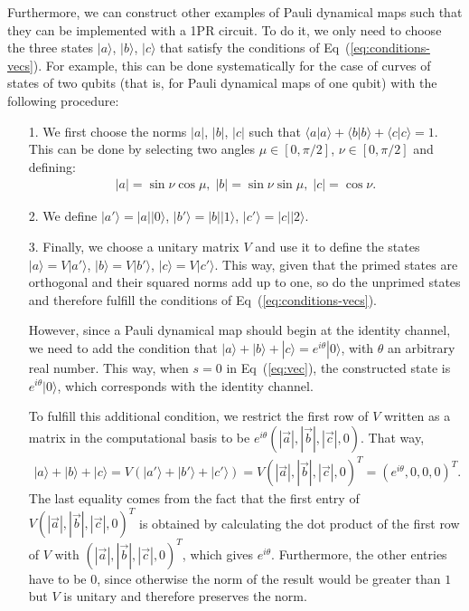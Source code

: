 \documentclass[10pt,letterpaper]{article} %
\newcommand{\eref}[1]{Eq~(\ref{#1})}
\begin{document}
Furthermore, we can construct other examples of 
Pauli dynamical maps such that they
can be implemented with a 1PR circuit.
To do it, we only need to choose the three states $|a\rangle$, $|b\rangle$, $|c\rangle$
that satisfy the conditions of  \eref{eq:conditions-vecs}.
For example, this can be done systematically for the case of curves of states of two qubits
(that is, for Pauli dynamical maps of one qubit)
with the following procedure:
\begin{itemize}
\item[1.] We first choose the norms $|a|$, $|b|$, $|c|$
such that $\langle a| a\rangle + \langle b| b\rangle + \langle c| c\rangle = 1$. 
This can be done by selecting two angles
$\mu \in [0, \pi/2]$, $\nu \in [0,\pi/2]$ and defining:
\begin{align*}
|a| = \sin \nu \cos \mu, \; |b| = \sin \nu \sin \mu , \; |c| = \cos \nu.
\end{align*}
\item[2.] We define $|a'\rangle = |a| |0\rangle$, $|b'\rangle = |b| |1\rangle$, $|c'\rangle = |c| |2\rangle$.
\item[3.] Finally, we choose a unitary matrix $V$ 
and use it to define the states $|a\rangle = V |a'\rangle$, $|b\rangle = V |b'\rangle$, $|c\rangle = V |c'\rangle$.
This way, given that the primed states are orthogonal and their squared norms add up to one,
so do the unprimed states and therefore 
fulfill the conditions of  \eref{eq:conditions-vecs}. 

However, since a Pauli dynamical map should begin at the
identity channel, we need to add the condition that $|a\rangle + |b\rangle + |c\rangle = e^{i \theta} |0\rangle$, with
$\theta$ an arbitrary real number. 
This way, when $s = 0$ in \eref{eq:vec}, the constructed state
is $e^{i \theta}|0\rangle$, which
corresponds with the identity channel.

To fulfill this additional condition,  we restrict the first row of
$V$ written as a matrix in 
the computational basis to be $e^{i\theta} (|\vec{a}|, |\vec{b}|, |\vec{c}|,0)$. 
That way, 
\begin{align*}
|a\rangle + |b\rangle + |c\rangle = V (|a'\rangle + |b'\rangle + |c'\rangle ) = V{(|\vec{a}|, |\vec{b}|, |\vec{c}|,0)}^T = {(e^{i\theta},0,0,0)}^T.
\end{align*}
The last equality comes from the fact
that the first entry of $V{(|\vec{a}|, |\vec{b}|, |\vec{c}|,0)}^T$
is obtained by calculating the dot product of the first row of $V$ with ${(|\vec{a}|, |\vec{b}|, |\vec{c}|,0)}^T$, which gives
$e^{i\theta}$. 
Furthermore, the other entries have to be $0$,
since otherwise the norm of the result would be greater than
$1$ but $V$ is unitary and therefore preserves the norm.
\end{itemize}
\end{document}
